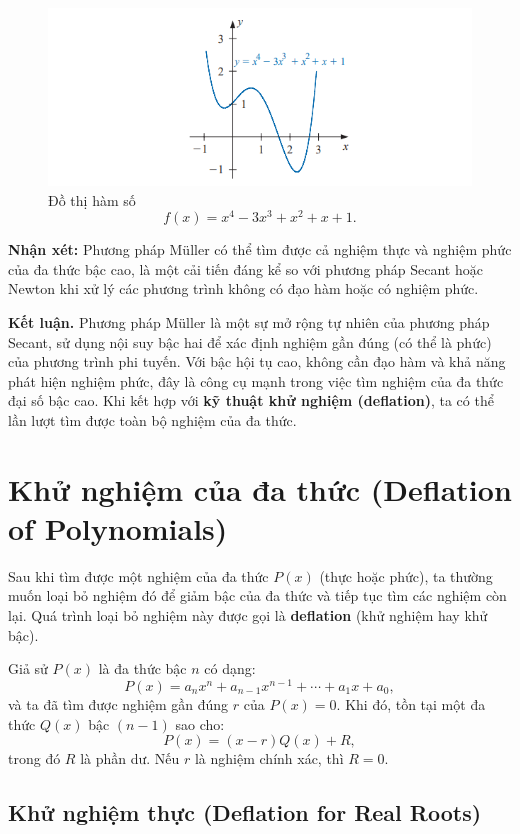 \begin{figure}[H]
        \centering
        \includegraphics[width=1\linewidth]{figures/đt bậc 4.png}
        \caption{Đồ thị hàm số \[
f(x) = x^4 - 3x^3 + x^2 + x + 1.
\]}
    \label{fig:placeholder}
\end{figure}
        
\textbf{Nhận xét:}  
Phương pháp Müller có thể tìm được cả nghiệm thực và nghiệm phức của đa thức bậc cao, là một cải tiến đáng kể so với phương pháp Secant hoặc Newton khi xử lý các phương trình không có đạo hàm hoặc có nghiệm phức.

\textbf{Kết luận.}  
Phương pháp Müller là một sự mở rộng tự nhiên của phương pháp Secant, sử dụng nội suy bậc hai để xác định nghiệm gần đúng (có thể là phức) của phương trình phi tuyến.  
Với bậc hội tụ cao, không cần đạo hàm và khả năng phát hiện nghiệm phức, đây là công cụ mạnh trong việc tìm nghiệm của đa thức đại số bậc cao.  
Khi kết hợp với \textbf{kỹ thuật khử nghiệm (deflation)}, ta có thể lần lượt tìm được toàn bộ nghiệm của đa thức.


\section{Khử nghiệm của đa thức (Deflation of Polynomials)}

Sau khi tìm được một nghiệm của đa thức $P(x)$ (thực hoặc phức), ta thường muốn loại bỏ nghiệm đó để giảm bậc của đa thức và tiếp tục tìm các nghiệm còn lại.  
Quá trình loại bỏ nghiệm này được gọi là \textbf{deflation} (khử nghiệm hay khử bậc).

Giả sử $P(x)$ là đa thức bậc $n$ có dạng:
\[
P(x) = a_nx^n + a_{n-1}x^{n-1} + \cdots + a_1x + a_0,
\]
và ta đã tìm được nghiệm gần đúng $r$ của $P(x) = 0$. Khi đó, tồn tại một đa thức $Q(x)$ bậc $(n-1)$ sao cho:
\[
P(x) = (x - r)Q(x) + R,
\]
trong đó $R$ là phần dư. Nếu $r$ là nghiệm chính xác, thì $R = 0$.

\subsection{Khử nghiệm thực (Deflation for Real Roots)}

